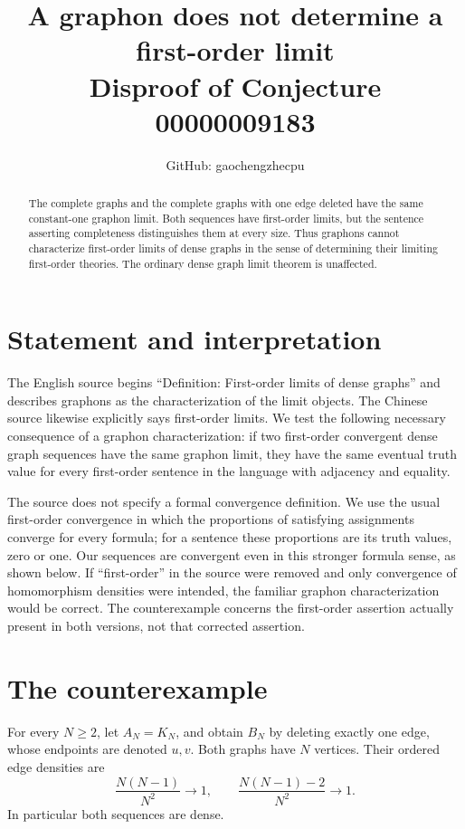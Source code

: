 \documentclass[11pt]{article}
\title{A graphon does not determine a first-order limit\\
\large Disproof of Conjecture 00000009183}
\author{GitHub: gaochengzhecpu}\date{}
\begin{document}
\maketitle
\begin{abstract}
The complete graphs and the complete graphs with one edge deleted have
the same constant-one graphon limit. Both sequences have first-order
limits, but the sentence asserting completeness distinguishes them at
every size. Thus graphons cannot characterize first-order limits of dense
graphs in the sense of determining their limiting first-order theories.
The ordinary dense graph limit theorem is unaffected.
\end{abstract}

\section*{Statement and interpretation}
The English source begins ``Definition: First-order limits of dense
graphs'' and describes graphons as the characterization of the limit
objects. The Chinese source likewise explicitly says first-order limits.
We test the following necessary consequence of a graphon characterization:
if two first-order convergent dense graph sequences have the same graphon
limit, they have the same eventual truth value for every first-order
sentence in the language with adjacency and equality.

The source does not specify a formal convergence definition. We use the
usual first-order convergence in which the proportions of satisfying
assignments converge for every formula; for a sentence these proportions
are its truth values, zero or one. Our sequences are convergent even in
this stronger formula sense, as shown below. If ``first-order'' in the
source were removed and only convergence of homomorphism densities were
intended, the familiar graphon characterization would be correct. The
counterexample concerns the first-order assertion actually present in both
versions, not that corrected assertion.

\section*{The counterexample}
For every $N\geq 2$, let $A_N=K_N$, and obtain $B_N$ by deleting exactly
one edge, whose endpoints are denoted $u,v$. Both graphs have $N$ vertices.
Their ordered edge densities are
\[
 \frac{N(N-1)}{N^2}\longrightarrow1,
 \qquad \frac{N(N-1)-2}{N^2}\longrightarrow1.
\]
In particular both sequences are dense.
\end{document}

